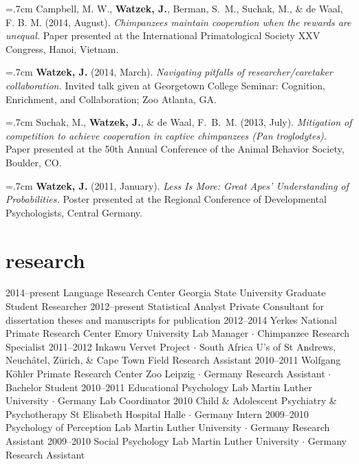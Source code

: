 \documentclass[]{friggeri-cv}
\begin{document}
\hangindent=.7cm Campbell, M. W., \textbf{Watzek, J.}, Berman, S.~M., Suchak, M., \& de Waal, F. B. M. (2014, August). \emph{Chimpanzees maintain cooperation when the rewards are unequal.} Paper presented at the International Primatological Society XXV Congress, Hanoi, Vietnam.

\hangindent=.7cm \textbf{Watzek, J.} (2014, March). \emph{Navigating pitfalls of researcher/caretaker collaboration.} Invited talk given at Georgetown College Seminar: Cognition, Enrichment, and Collaboration; Zoo Atlanta, GA.

\hangindent=.7cm Suchak, M., \textbf{Watzek, J.}, \& de Waal, F.~B.~M. (2013, July). \emph{Mitigation of competition to achieve cooperation in captive chimpanzees \emph{(Pan troglodytes)}.} Paper presented at the 50th Annual Conference of the Animal Behavior Society, Boulder, CO.

\hangindent=.7cm \textbf{Watzek, J.} (2011, January). \emph{Less Is More: Great Apes' Understanding of Probabilities.} Poster presented at the Regional Conference of Developmental Psychologists, Central Germany.\\[-.1cm]

\thispagestyle{fancy}

\section{research}

\begin{entrylist}
  \entry
    {2014--present}
    {Language Research Center}
    {Georgia State University}
    {Graduate Student Researcher}
  \entry
    {2012--present}
    {Statistical Analyst}
    {Private}
    {Consultant for dissertation theses and manuscripts for publication}
  \entry
    {2012--2014}
    {Yerkes National Primate Research Center}
    {Emory University}
    {Lab Manager $\cdot$ Chimpanzee Research Specialist}
  \entry
    {2011--2012}
    {Inkawu Vervet Project $\cdot$ South Africa}
    {U's of St Andrews, Neuch\^{a}tel, Z\"urich, \& Cape Town}
    {Field Research Assistant}
  \entry
    {2010--2011}
    {Wolfgang K\"{o}hler Primate Research Center}
    {Zoo Leipzig $\cdot$ Germany}
    {Research Assistant $\cdot$ Bachelor Student}
  \entry
    {2010--2011}
    {Educational Psychology Lab}
    {Martin Luther University $\cdot$ Germany}
    {Lab Coordinator}
  \entry
    {2010}
    {Child \& Adolescent Psychiatry \& Psychotherapy}
    {St Elisabeth Hospital Halle $\cdot$ Germany}
    {Intern}
  \entry
    {2009--2010}
    {Psychology of Perception Lab}
    {Martin Luther University $\cdot$ Germany}
    {Research Assistant}
  \entry
    {2009--2010}
    {Social Psychology Lab}
    {Martin Luther University $\cdot$ Germany}
    {Research Assistant}
\end{entrylist}
\end{document}
